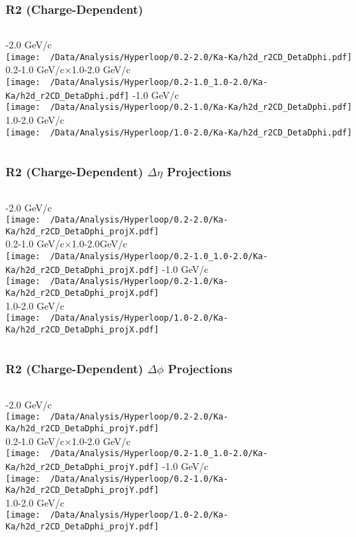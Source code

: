 \documentclass{beamer}
\begin{document}
\begin{frame}
	\frametitle{R2 (Charge-Dependent)}
	\begin{columns}
		-2.0 GeV/c\\
		\texttt{[image: ~/Data/Analysis/Hyperloop/0.2-2.0/Ka-Ka/h2d\_r2CD\_DetaDphi.pdf]}\\0.2-1.0 GeV/c$\times$1.0-2.0 GeV/c\\
		\texttt{[image: ~/Data/Analysis/Hyperloop/0.2-1.0\_1.0-2.0/Ka-Ka/h2d\_r2CD\_DetaDphi.pdf]}
		-1.0 GeV/c\\
		\texttt{[image: ~/Data/Analysis/Hyperloop/0.2-1.0/Ka-Ka/h2d\_r2CD\_DetaDphi.pdf]}\\1.0-2.0 GeV/c\\
		\texttt{[image: ~/Data/Analysis/Hyperloop/1.0-2.0/Ka-Ka/h2d\_r2CD\_DetaDphi.pdf]}
	\end{columns}
\end{frame}
\begin{frame}
	\frametitle{R2 (Charge-Dependent) $\Delta\eta$ Projections}
	\begin{columns}
		\column{0.5\textwidth}
		-2.0 GeV/c\\
		\texttt{[image: ~/Data/Analysis/Hyperloop/0.2-2.0/Ka-Ka/h2d\_r2CD\_DetaDphi\_projX.pdf]}\\0.2-1.0 GeV/c$\times$1.0-2.0GeV/c\\
		\texttt{[image: ~/Data/Analysis/Hyperloop/0.2-1.0\_1.0-2.0/Ka-Ka/h2d\_r2CD\_DetaDphi\_projX.pdf]}
		\column{0.5\textwidth}
		-1.0 GeV/c\\
		\texttt{[image: ~/Data/Analysis/Hyperloop/0.2-1.0/Ka-Ka/h2d\_r2CD\_DetaDphi\_projX.pdf]}\\1.0-2.0 GeV/c\\
		\texttt{[image: ~/Data/Analysis/Hyperloop/1.0-2.0/Ka-Ka/h2d\_r2CD\_DetaDphi\_projX.pdf]}
	\end{columns}
\end{frame}
\begin{frame}
	\frametitle{R2 (Charge-Dependent) $\Delta\phi$ Projections}
	\begin{columns}
		-2.0 GeV/c\\
		\texttt{[image: ~/Data/Analysis/Hyperloop/0.2-2.0/Ka-Ka/h2d\_r2CD\_DetaDphi\_projY.pdf]}\\0.2-1.0 GeV/c$\times$1.0-2.0 GeV/c\\
		\texttt{[image: ~/Data/Analysis/Hyperloop/0.2-1.0\_1.0-2.0/Ka-Ka/h2d\_r2CD\_DetaDphi\_projY.pdf]}
		-1.0 GeV/c\\
		\texttt{[image: ~/Data/Analysis/Hyperloop/0.2-1.0/Ka-Ka/h2d\_r2CD\_DetaDphi\_projY.pdf]}\\1.0-2.0 GeV/c\\
		\texttt{[image: ~/Data/Analysis/Hyperloop/1.0-2.0/Ka-Ka/h2d\_r2CD\_DetaDphi\_projY.pdf]}
	\end{columns}
\end{frame}
\end{document}
